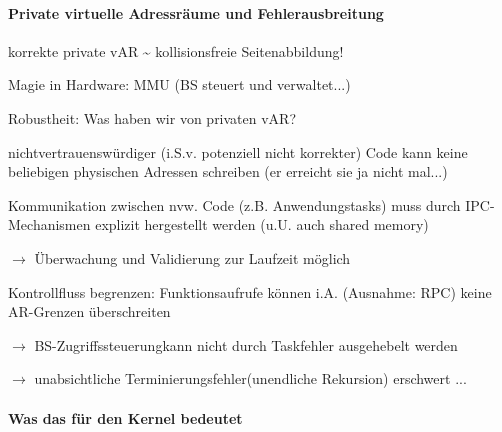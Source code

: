 \documentclass[a4paper]{article}
\newcommand{\cmark}{\ding{51}}
\begin{document}
\begin{multicols}{3}
    \paragraph{Private virtuelle Adressräume und
        Fehlerausbreitung}

    \begin{itemize*}
        \item
        korrekte private vAR \textasciitilde{} kollisionsfreie
        Seitenabbildung!
        \item
        Magie in Hardware: MMU (BS steuert und verwaltet...)
        \item
        Robustheit: Was haben wir von privaten vAR?
        \begin{itemize*}
            \item \cmark nichtvertrauenswürdiger (i.S.v. potenziell nicht korrekter) Code kann keine beliebigen physischen Adressen schreiben (er erreicht sie ja nicht mal...)
            \item \cmark Kommunikation zwischen nvw. Code (z.B. Anwendungstasks) muss durch IPC-Mechanismen explizit hergestellt werden (u.U. auch shared memory) \begin{itemize*} \item $\rightarrow$ Überwachung und Validierung zur Laufzeit möglich \end{itemize*}
            \item \cmark Kontrollfluss begrenzen: Funktionsaufrufe können i.A. (Ausnahme: RPC) keine AR-Grenzen überschreiten \begin{itemize*} \item $\rightarrow$ BS-Zugriffssteuerungkann nicht durch Taskfehler ausgehebelt werden \item $\rightarrow$ unabsichtliche Terminierungsfehler(unendliche Rekursion) erschwert ... \end{itemize*}
        \end{itemize*}
    \end{itemize*}


    \paragraph{Was das für den Kernel
        bedeutet}


\end{multicols}
\end{document}
